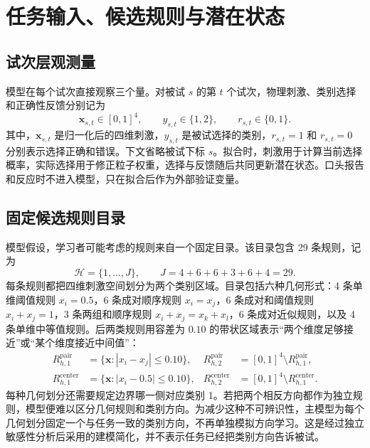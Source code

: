 \documentclass[12pt]{article}
\begin{document}
\section{任务输入、候选规则与潜在状态}

\subsection{试次层观测量}

模型在每个试次直接观察三个量。对被试 $s$ 的第 $t$ 个试次，物理刺激、类别选择和正确性反馈分别记为
\begin{equation}
\bm x_{s,t}\in[0,1]^4,
\qquad
y_{s,t}\in\{1,2\},
\qquad
r_{s,t}\in\{0,1\}.
\label{eq:observations}
\end{equation}
其中，$\bm x_{s,t}$ 是归一化后的四维刺激，$y_{s,t}$ 是被试选择的类别，$r_{s,t}=1$ 和 $r_{s,t}=0$ 分别表示选择正确和错误。下文省略被试下标 $s$。拟合时，刺激用于计算当前选择概率，实际选择用于修正粒子权重，选择与反馈随后共同更新潜在状态。口头报告和反应时不进入模型，只在拟合后作为外部验证变量。

\subsection{固定候选规则目录}

模型假设，学习者可能考虑的规则来自一个固定目录。该目录包含 29 条规则，记为
\begin{equation}
\mathcal H=\{1,\ldots,J\},
\qquad
J=4+6+6+3+6+4=29.
\label{eq:rule-space}
\end{equation}
每条规则都把四维刺激空间划分为两个类别区域。目录包括六种几何形式：4 条单维阈值规则 $x_i=0.5$，6 条成对顺序规则 $x_i=x_j$，6 条成对和阈值规则 $x_i+x_j=1$，3 条两组和顺序规则 $x_i+x_j=x_k+x_l$，6 条成对近似规则，以及 4 条单维中等值规则。后两类规则用容差为 $0.10$ 的带状区域表示“两个维度足够接近”或“某个维度接近中间值”：
\begin{align}
R_{h,1}^{\mathrm{pair}}
&=\{\bm x:|x_i-x_j|\leq0.10\},
&
R_{h,2}^{\mathrm{pair}}
&=[0,1]^4\setminus R_{h,1}^{\mathrm{pair}},
\nonumber\\
R_{h,1}^{\mathrm{center}}
&=\{\bm x:|x_i-0.5|\leq0.10\},
&
R_{h,2}^{\mathrm{center}}
&=[0,1]^4\setminus R_{h,1}^{\mathrm{center}}.
\label{eq:band-rules}
\end{align}
每种几何划分还需要规定边界哪一侧对应类别 1。若把两个相反方向都作为独立规则，模型便难以区分几何规则和类别方向。为减少这种不可辨识性，主模型为每个几何划分固定一个与任务一致的类别方向，不再单独模拟方向学习。这是经过独立敏感性分析后采用的建模简化，并不表示任务已经把类别方向告诉被试。
\end{document}
